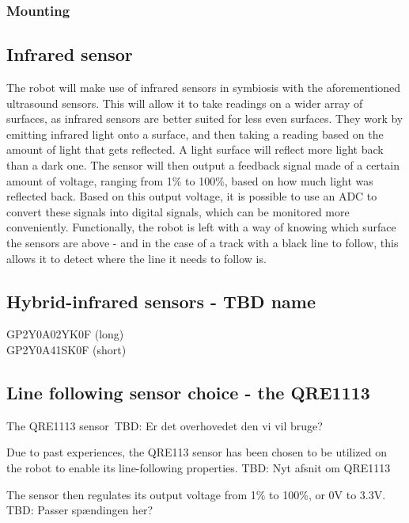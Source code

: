 \subsubsection{Mounting}

\subsection{Infrared sensor}

The robot will make use of infrared sensors in symbiosis with the aforementioned ultrasound sensors. This will allow it to take readings on a wider array of surfaces, as infrared sensors are better suited for less even surfaces. They work by emitting infrared light onto a surface, and then taking a reading based on the amount of light that gets reflected. A light surface will reflect more light back than a dark one. The sensor will then output a feedback signal made of a certain amount of voltage, ranging from 1\% to 100\%, based on how much light was reflected back. Based on this output voltage, it is possible to use an ADC to convert these signals into digital signals, which can be monitored more conveniently. Functionally, the robot is left with a way of knowing which surface the sensors are above - and in the case of a track with a black line to follow, this allows it to detect where the line it needs to follow is.\\

\subsection{Hybrid-infrared sensors - TBD name}

GP2Y0A02YK0F (long) \\	
GP2Y0A41SK0F (short) \\

\subsection{Line following sensor choice - the QRE1113} 

The QRE1113 sensor\
TBD: Er det overhovedet den vi vil bruge?\

Due to past experiences, the QRE113 sensor has been chosen to be utilized on the robot to enable its line-following properties. TBD: Nyt afsnit om QRE1113

The sensor then regulates its output voltage from 1\% to 100\%, or 0V to 3.3V. TBD: Passer spændingen her?\\

